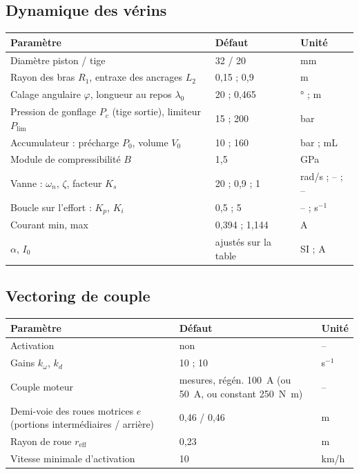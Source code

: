 \documentclass[11pt,a4paper]{article}
\begin{document}
\subsection{Dynamique des vérins}\label{sec:param_verin}
\begin{center}\small
\begin{tabular}{@{}p{8cm}ll@{}}\toprule
Paramètre & Défaut & Unité\\\midrule
Diamètre piston / tige & 32 / 20 & mm\\
Rayon des bras $R_1$, entraxe des ancrages $L_2$ & 0,15 ; 0,9 & m\\
Calage angulaire $\varphi$, longueur au repos $\lambda_0$ & 20 ; 0,465 & \si{\degree} ; m\\
Pression de gonflage $P_c$ (tige sortie), limiteur $P_{\lim}$ & 15 ; 200 & bar\\
Accumulateur : précharge $P_0$, volume $V_0$ & 10 ; 160 & bar ; mL\\
Module de compressibilité $B$ & 1,5 & GPa\\
Vanne : $\omega_n$, $\zeta$, facteur $K_s$ & 20 ; 0,9 ; 1 & rad/s ; -- ; --\\
Boucle sur l'effort : $K_p$, $K_i$ & 0,5 ; 5 & -- ; s$^{-1}$\\
Courant min, max & 0,394 ; 1,144 & A\\
$\alpha$, $I_0$ & ajustés sur la table & SI ; A\\\bottomrule
\end{tabular}
\end{center}

\subsection{Vectoring de couple}
\begin{center}\small
\begin{tabular}{@{}p{8cm}ll@{}}\toprule
Paramètre & Défaut & Unité\\\midrule
Activation & non & --\\
Gains $k_\omega$, $k_d$ & 10 ; 10 & s$^{-1}$\\
Couple moteur & mesures, régén. 100~A (ou 50~A, ou constant \SI{250}{N.m}) & --\\
Demi-voie des roues motrices $e$ (portions intermédiaires / arrière) & 0,46 / 0,46 & m\\
Rayon de roue $r_{\text{eff}}$ & 0,23 & m\\
Vitesse minimale d'activation & 10 & km/h\\\bottomrule
\end{tabular}
\end{center}
\end{document}
